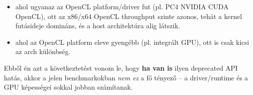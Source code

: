 \begin{itemize}
  \item ahol ugyanaz az OpenCL platform/driver fut (pl. PC4 NVIDIA CUDA OpenCL), ott az x86/x64 OpenCL throughput szinte azonos,
        tehát a kernel futásideje domináns, és a host architektúra alig látszik.
  \item ahol az OpenCL platform eleve gyengébb (pl. integrált GPU), ott is csak kicsi az arch különbség.
\end{itemize}

Ebből én azt a következtetést vonom le, hogy \textbf{ha van is} ilyen deprecated API hatás,
akkor a jelen benchmarkokban \emph{nem ez} a fő tényező -- a driver/runtime és a GPU képességei sokkal jobban számítanak.

\cleardoublepage
